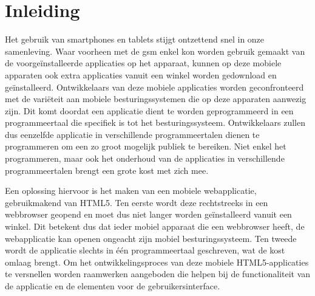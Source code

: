 \chapter{Inleiding} %
\label{inleiding}


Het gebruik van smartphones en tablets stijgt ontzettend snel in onze samenleving.
Waar voorheen met de gsm enkel kon worden gebruik gemaakt van de voorgeïnstalleerde applicaties op het apparaat, kunnen op deze mobiele apparaten ook extra applicaties vanuit een winkel worden gedownload en geïnstalleerd.
Ontwikkelaars van deze mobiele applicaties worden geconfronteerd met de variëteit aan mobiele besturingssystemen die op deze apparaten aanwezig zijn.
Dit komt doordat een applicatie dient te worden geprogrammeerd in een programmeertaal die specifiek is tot het besturingssysteem.
Ontwikkelaars zullen dus eenzelfde applicatie in verschillende programmeertalen dienen te programmeren om een zo groot mogelijk publiek te bereiken.
Niet enkel het programmeren, maar ook het onderhoud van de applicaties in verschillende programmeertalen brengt een grote kost met zich mee.

Een oplossing hiervoor is het maken van een mobiele webapplicatie, gebruikmakend van HTML5.
Ten eerste wordt deze rechtstreeks in een webbrowser geopend en moet dus niet langer worden geïnstalleerd vanuit een winkel.
Dit betekent dus dat ieder mobiel apparaat die een webbrowser heeft, de webapplicatie kan openen ongeacht zijn mobiel besturingssysteem.
Ten tweede wordt de applicatie slechts in één programmeertaal geschreven, wat de kost omlaag brengt.
Om het ontwikkelingsproces van deze mobiele HTML5-applicaties te versnellen worden raamwerken aangeboden die helpen bij de functionaliteit van de applicatie en de elementen voor de gebruikersinterface. 

